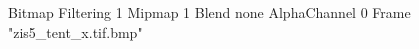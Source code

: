 {Bitmap
	{Filtering 1}
	{Mipmap 1}
	{Blend none}
	{AlphaChannel 0}
	{Frame "zis5_tent_x.tif.bmp"}
}
